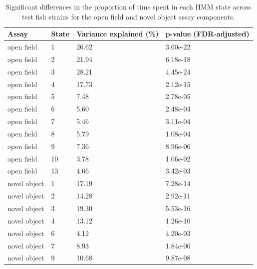 \documentclass[
]{book}
\begin{document}
\begin{table}

\caption{\label{tab:pilot-dge-tbl}Significant differences in the proportion of time spent in each HMM state across test fish strains for the open field and novel object assay components.}
\centering
\begin{tabular}[t]{llll}
\toprule
Assay & State & Variance explained (\%) & p-value (FDR-adjusted)\\
\midrule
open field & 1 & 26.62 & 3.60e-22\\
open field & 2 & 21.94 & 6.18e-18\\
open field & 3 & 28.21 & 4.45e-24\\
open field & 4 & 17.73 & 2.12e-15\\
open field & 5 & 7.48 & 2.78e-05\\
\addlinespace
open field & 6 & 5.60 & 2.48e-04\\
open field & 7 & 5.46 & 3.11e-04\\
open field & 8 & 5.79 & 1.08e-04\\
open field & 9 & 7.36 & 8.96e-06\\
open field & 10 & 3.78 & 1.06e-02\\
\addlinespace
open field & 13 & 4.66 & 3.42e-03\\
novel object & 1 & 17.19 & 7.28e-14\\
novel object & 2 & 14.28 & 2.92e-11\\
novel object & 3 & 19.30 & 5.53e-16\\
novel object & 4 & 13.12 & 1.26e-10\\
\addlinespace
novel object & 6 & 4.12 & 4.20e-03\\
novel object & 7 & 8.93 & 1.84e-06\\
novel object & 9 & 10.68 & 9.87e-08\\
\bottomrule
\end{tabular}
\end{table}
\end{document}
